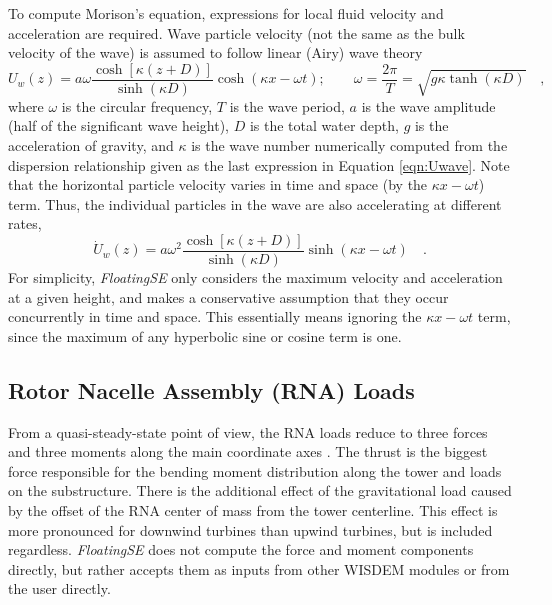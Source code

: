 To compute Morison's equation, expressions for local fluid velocity and
acceleration are required.  Wave particle velocity (not the same as the bulk
velocity of the wave) is assumed to follow linear (Airy) wave theory
\begin{equation} \label{eqn:Uwave}
U_w(z) = a\omega\frac{\cosh\left[\kappa\left(z + D \right)\right]}{\sinh\left(\kappa D\right)}\cosh\left(\kappa x -
  \omega t\right);
\qquad \omega=\frac{2\pi}{T} = \sqrt{ g \kappa \tanh\left(\kappa
    D\right) } \quad,
\end{equation}
where $\omega$ is the circular frequency, $T$ is the wave period, $a$ is
the wave amplitude (half of the significant wave height), $D$ is the
total water depth, $g$ is the acceleration of gravity, and $\kappa$ is
the wave number numerically computed from the dispersion relationship
given as the last expression in Equation \ref{eqn:Uwave}.  Note that the
horizontal particle velocity varies in time and space (by the
$\kappa x - \omega t$) term.  Thus, the individual particles in the wave
are also accelerating at different rates,
\begin{equation} \label{eqn:Awave}
\dot{U}_w(z) = a\omega^2\frac{\cosh\left[\kappa\left(z + D \right)\right]}{\sinh\left(\kappa D\right)}\sinh\left(\kappa x -
  \omega t\right)\quad.
\end{equation}
For
simplicity, \textit{FloatingSE} only considers the maximum velocity and
acceleration at a given height, and makes a conservative assumption that
they occur concurrently in time and space.  This essentially means ignoring the
$\kappa x - \omega t$ term, since the maximum of any hyperbolic sine or cosine
term is one.


\subsection{Rotor Nacelle Assembly (RNA) Loads}
From a quasi-steady-state point of view, the RNA loads reduce to three
forces and three moments along the main coordinate axes
\citep{JacketSE}. The thrust is the biggest force responsible for the
bending moment distribution along the tower and loads on the
substructure.  There is the additional effect of the gravitational load
caused by the offset of the RNA center of mass from the tower
centerline.  This effect is more pronounced for downwind turbines than
upwind turbines, but is included regardless.  \textit{FloatingSE} does
not compute the force and moment components directly, but rather accepts
them as inputs from other WISDEM modules or from the user directly.


